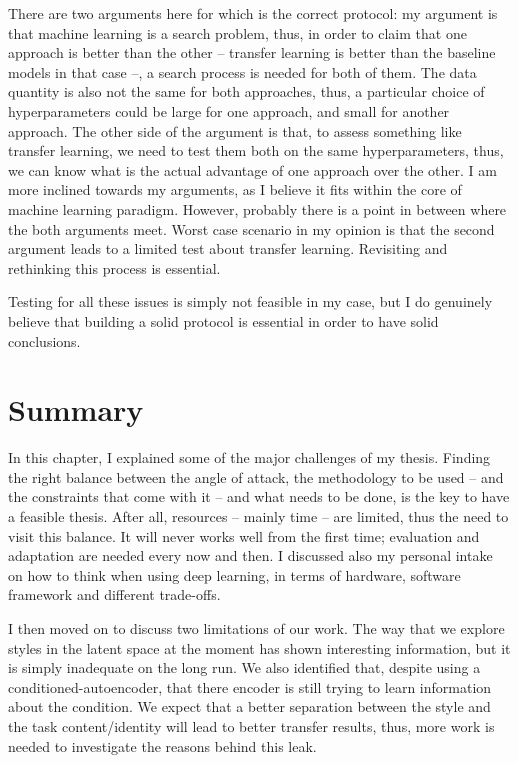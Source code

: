 \begin{itemize}
      There are two arguments here for which is the correct protocol: my argument is that machine learning is a search problem, thus, in order to claim that one approach is better than the other -- transfer learning is better than the baseline models in that case --, a search process is needed for both of them. The data quantity is also not the same for both approaches, thus, a particular choice of hyperparameters could be large for one approach, and small for another approach. The other side of the argument is that, to assess something like transfer learning, we need to test them both on the same hyperparameters, thus, we can know what is the actual advantage of one approach over the other. I am more inclined towards my arguments, as I believe it fits within the core of machine learning paradigm. However, probably there is a point in between where the both arguments meet. Worst case scenario in my opinion is that the second argument leads to a limited test about transfer learning. Revisiting and rethinking this process is essential.
    \end{itemize}
    \par Testing for all these issues is simply not feasible in my case, but I do genuinely believe that building a solid protocol is essential in order to have solid conclusions.


  \section{Summary}
  \par In this chapter, I explained some of the major challenges of my thesis. Finding the right balance between the angle of attack, the methodology to be used -- and the constraints that come with it -- and what needs to be done, is the key to have a feasible thesis. After all, resources -- mainly time -- are limited, thus the need to visit this balance. It will never works well from the first time; evaluation and adaptation are needed every now and then. I discussed also my personal intake on how to think when using deep learning, in terms of hardware, software framework and different trade-offs.

  \par I then moved on to discuss two limitations of our work. The way that we explore styles in the latent space at the moment has shown interesting information, but it is simply inadequate on the long run. We also identified that, despite using a conditioned-autoencoder, that there encoder is still trying to learn information about the condition. We expect that a better separation between the style and the task content/identity will lead to better transfer results, thus, more work is needed to investigate the reasons behind this leak.

